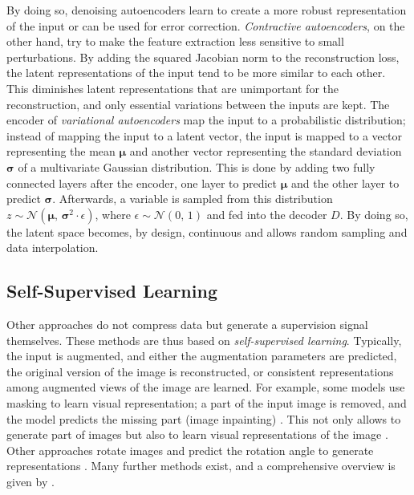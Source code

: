 By doing so, denoising autoencoders learn to create a more robust representation of the input or can be used for error correction.
\emph{Contractive autoencoders}, on the other hand, try to make the feature extraction less sensitive to small perturbations.
By adding the squared Jacobian norm to the reconstruction loss, the latent representations of the input tend to be more similar to each other.
This diminishes latent representations that are unimportant for the reconstruction, and only essential variations between the inputs are kept.
The encoder of \emph{variational autoencoders} map the input to a probabilistic distribution; instead of mapping the input to a latent vector, the input is mapped to a vector representing the mean $\boldsymbol{\mu}$ and another vector representing the standard deviation $\boldsymbol{\sigma}$ of a multivariate Gaussian distribution.
This is done by adding two fully connected layers after the encoder, one layer to predict $\boldsymbol{\mu}$ and the other layer to predict $\boldsymbol{\sigma}$.
Afterwards, a variable is sampled from this distribution $z \sim \mathcal{N}(\boldsymbol{\mu},\, \boldsymbol{\sigma}^{2} \cdot \epsilon)$, where $\epsilon \sim \mathcal{N}(0,\,1)$  and fed into the decoder $D$.
By doing so, the latent space becomes, by design, continuous and allows random sampling and data interpolation.



\subsection{Self-Supervised Learning}
Other approaches do not compress data but generate a supervision signal themselves.
These methods are thus based on \emph{self-supervised learning}.
Typically, the input is augmented, and either the augmentation parameters are predicted, the original version of the image is reconstructed, or consistent representations among augmented views of the image are learned.
For example, some models use masking to learn visual representation;
a part of the input image is removed, and the model predicts the missing part (image inpainting) \cite{Elharrouss_Almaadeed_Al-Maadeed_Akbari_2020}.
This not only allows to generate part of images but also to learn visual representations of the image .
Other approaches rotate images and predict the rotation angle to generate representations .
Many further methods exist, and a comprehensive overview is given by .

